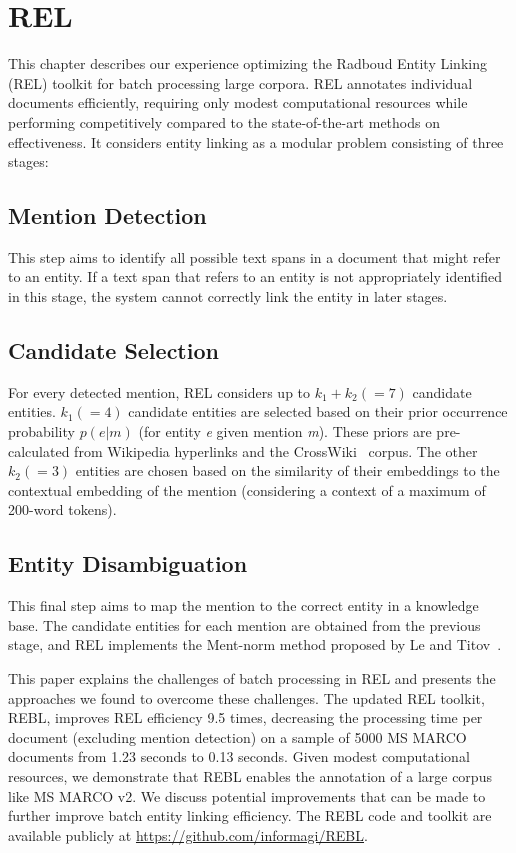 \section{REL}
This chapter describes our experience optimizing the Radboud Entity Linking (REL) toolkit for batch processing large corpora. REL annotates individual documents efficiently, requiring only modest computational resources while performing competitively compared to the state-of-the-art methods on effectiveness. It considers entity linking as a modular problem consisting of three stages: 

\subsection{Mention Detection}
This step aims to identify all possible text spans in a document that might refer to an entity. If a text span that refers to an entity is not appropriately identified in this stage, the system cannot correctly link the entity in later stages.

\subsection{Candidate Selection} For every detected mention, REL considers up to $k_1 + k_2 (=7)$ candidate entities. $k_1 (=4)$ candidate entities are selected based on their prior occurrence probability $p(e|m)$ (for entity \textit{e} given mention \textit{m}). These priors are pre-calculated from Wikipedia hyperlinks and the CrossWiki~\cite{cross-wiki} corpus. The other $k_2 (=3)$ entities are chosen based on the similarity of their embeddings to the contextual embedding of the mention (considering a context of a maximum of 200-word tokens).

\subsection{Entity Disambiguation} This final step aims to map the mention to the correct entity in a knowledge base. The candidate entities for each mention are obtained from the previous stage, and REL implements the Ment-norm method proposed by Le and Titov~\cite{ED-paper}. 

This paper explains the challenges of batch processing in REL and presents the approaches we found to overcome these challenges. The updated REL toolkit, REBL, improves REL efficiency 9.5 times, decreasing the processing time per document (excluding mention detection) on a sample of 5000 MS MARCO documents from 1.23 seconds to 0.13 seconds. Given modest computational resources, we demonstrate that REBL enables the annotation of a large corpus like MS MARCO v2. We discuss potential improvements that can be made to further improve batch entity linking efficiency. The REBL code and toolkit are available publicly at \url{https://github.com/informagi/REBL}.

